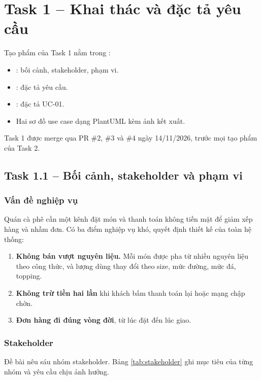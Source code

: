\section{Task 1 -- Khai thác và đặc tả yêu cầu}\label{ch:yeucau}

Tạo phẩm của Task 1 nằm trong :
\begin{itemize}
\item {}: bối cảnh, stakeholder, phạm vi.
\item {}: đặc tả yêu cầu.
\item {}: đặc tả UC-01.
\item Hai sơ đồ use case dạng PlantUML kèm ảnh kết xuất.
\end{itemize}

Task 1 được merge qua PR \#2, \#3 và \#4 ngày 14/11/2026, trước mọi tạo phẩm của Task 2.

\subsection{Task 1.1 -- Bối cảnh, stakeholder và phạm vi}

\subsubsection{Vấn đề nghiệp vụ}
Quán cà phê cần một kênh đặt món và thanh toán không tiền mặt để giảm xếp hàng và nhầm đơn. Có ba điểm nghiệp vụ khó, quyết định thiết kế của toàn hệ thống:

\begin{enumerate}
\item \textbf{Không bán vượt nguyên liệu.} Mỗi món được pha từ nhiều nguyên liệu theo công thức, và lượng dùng thay đổi theo size, mức đường, mức đá, topping.
\item \textbf{Không trừ tiền hai lần} khi khách bấm thanh toán lại hoặc mạng chập chờn.
\item \textbf{Đơn hàng đi đúng vòng đời}, từ lúc đặt đến lúc giao.
\end{enumerate}

\subsubsection{Stakeholder}
Đề bài nêu sáu nhóm stakeholder. Bảng \ref{tab:stakeholder} ghi mục tiêu của từng nhóm và yêu cầu chịu ảnh hưởng.


